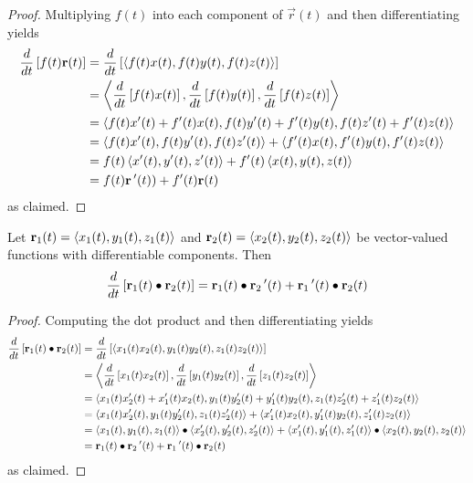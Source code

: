 \documentclass[handout]{ximera}
\begin{document}
\begin{proof}
Multiplying $f(t)$ into each component of $\vec r(t)$ and then differentiating yields
\begin{align*}
\frac{d}{dt}\left[f(t)\mathbf r(t)\right] &= \frac{d}{dt} \left[ \left\langle f(t)x(t), f(t)y(t),f(t)z(t)\right\rangle\right]\\
&=  \left\langle \frac{d}{dt} \left[f(t)x(t)\right], \frac{d}{dt} \left[f(t)y(t)\right],\frac{d}{dt} \left[f(t)z(t)\right]\right\rangle\\
&= \left\langle f(t)x'(t) + f'(t)x(t), f(t)y'(t) + f'(t)y(t), f(t)z'(t) + f'(t)z(t)\right\rangle\\
&=\left\langle f(t)x'(t) , f(t)y'(t), f(t)z'(t)\right\rangle+ \left\langle f'(t)x(t), f'(t)y(t), f'(t)z(t)\right\rangle\\
&= f(t)\left\langle x'(t), y'(t), z'(t)\right\rangle + f'(t)\left\langle x(t), y(t), z(t)\right\rangle\\
&= f(t)\mathbf r\,'(t)) + f'(t)\mathbf r(t)
\end{align*}
as claimed.
\end{proof}

\begin{proposition}
Let $\mathbf r_1(t) = \left\langle x_1(t), y_1(t),z_1(t)\right\rangle$ and $\mathbf r_2(t) = \left\langle x_2(t), y_2(t),z_2(t)\right\rangle$ be vector-valued functions with differentiable components.
Then
\[
\frac{d}{dt}\left[\mathbf r_1(t) \bullet \mathbf r_2(t)\right] = \mathbf r_1(t)\bullet \mathbf r_2\,'(t) + \mathbf r_1\,'(t)\bullet\mathbf r_2(t)
\]
\end{proposition}
\begin{proof}
Computing the dot product and then differentiating yields
\begin{align*}
\frac{d}{dt}\left[\mathbf r_1(t) \bullet \mathbf r_2(t)\right] &= \frac{d}{dt} \left[ \left\langle x_1(t)x_2(t), y_1(t)y_2(t), z_1(t)z_2(t)\right\rangle\right]\\
&=  \left\langle \frac{d}{dt} \left[x_1(t)x_2(t)\right], \frac{d}{dt} \left[y_1(t)y_2(t)\right],\frac{d}{dt} \left[z_1(t)z_2(t)\right]\right\rangle\\
&= \left\langle x_1(t)x_2'(t) +x_1'(t)x_2(t), y_1(t)y_2'(t) +y_1'(t)y_2(t), z_1(t)z_2'(t) +z_1'(t)z_2(t)\right\rangle\\
&=\left\langle x_1(t)x_2'(t) , y_1(t)y_2'(t), z_1(t)z_2'(t)\right\rangle+ \left\langle x_1'(t)x_2(t), y_1'(t)y_2(t), z_1'(t)z_2(t)\right\rangle\\
&= \left\langle x_1(t), y_1(t), z_1(t)\right\rangle\bullet \left\langle x_2'(t), y_2'(t), z_2'(t)\right\rangle + \left\langle x_1'(t), y_1'(t), z_1'(t)\right\rangle\bullet \left\langle x_2(t), y_2(t), z_2(t)\right\rangle\\
&= \mathbf r_1(t) \bullet \mathbf r_2\,'(t) + \mathbf r_1\,'(t) \bullet \mathbf r_2(t)
\end{align*}
as claimed.
\end{proof}
\end{document}
